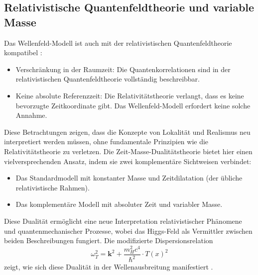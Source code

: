 \documentclass[12pt,a4paper]{article}
\begin{document}
	\subsection{Relativistische Quantenfeldtheorie und variable Masse}
	Das Wellenfeld-Modell ist auch mit der relativistischen Quantenfeldtheorie kompatibel \cite{Weinberg1995}:
	\begin{itemize}
		\item Verschränkung in der Raumzeit: Die Quantenkorrelationen sind in der relativistischen Quantenfeldtheorie vollständig beschreibbar.
		\item Keine absolute Referenzzeit: Die Relativitätstheorie verlangt, dass es keine bevorzugte Zeitkoordinate gibt. Das Wellenfeld-Modell erfordert keine solche Annahme.
	\end{itemize}
	Diese Betrachtungen zeigen, dass die Konzepte von Lokalität und Realismus neu interpretiert werden müssen, ohne fundamentale Prinzipien wie die Relativitätstheorie zu verletzen. Die Zeit-Masse-Dualitätstheorie bietet hier einen vielversprechenden Ansatz, indem sie zwei komplementäre Sichtweisen verbindet:
	\begin{itemize}
		\item Das Standardmodell mit konstanter Masse und Zeitdilatation (der übliche relativistische Rahmen).
		\item Das komplementäre Modell mit absoluter Zeit und variabler Masse.
	\end{itemize}
	Diese Dualität ermöglicht eine neue Interpretation relativistischer Phänomene und quantenmechanischer Prozesse, wobei das Higgs-Feld als Vermittler zwischen beiden Beschreibungen fungiert. Die modifizierte Dispersionsrelation
	\begin{equation}
		\omega_T^2 = \mathbf{k}^2 + \frac{m_H^2 c^4}{\hbar^2} \cdot T(x)^2
	\end{equation}
	zeigt, wie sich diese Dualität in der Wellenausbreitung manifestiert \cite{Pascher2024}.
	
\end{document}
